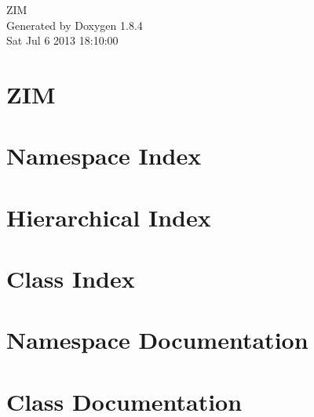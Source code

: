 \documentclass[twoside]{book}
\newcommand{\clearemptydoublepage}{%
  \newpage{\pagestyle{empty}\cleardoublepage}%
}
\begin{document}
\hypersetup{pageanchor=false}
\begin{titlepage}
\vspace*{7cm}
\begin{center}%
{\Large Z\-I\-M }\\
\vspace*{1cm}
{\large Generated by Doxygen 1.8.4}\\
\vspace*{0.5cm}
{\small Sat Jul 6 2013 18:10:00}\\
\end{center}
\end{titlepage}
\clearemptydoublepage
\tableofcontents
\clearemptydoublepage
{}
\hypersetup{pageanchor=true}

\chapter{Z\-I\-M}
\label{md_C:_Users_Igor_Android_workspace_ZIM_README}
\hypertarget{md_C:_Users_Igor_Android_workspace_ZIM_README}{}

\chapter{Namespace Index}

\chapter{Hierarchical Index}

\chapter{Class Index}

\chapter{Namespace Documentation}

\chapter{Class Documentation}




















\newpage
{}
{}
\printindex
\end{document}
